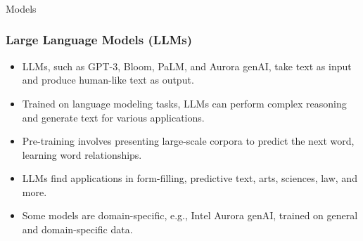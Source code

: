 \begin{frame}[fragile]\frametitle{}
\begin{center}
{\Large Models}
\end{center}
\end{frame}

\begin{frame}[fragile]
\frametitle{Large Language Models (LLMs)}

\begin{itemize}
    \item LLMs, such as GPT-3, Bloom, PaLM, and Aurora genAI, take text as input and produce human-like text as output.
    \item Trained on language modeling tasks, LLMs can perform complex reasoning and generate text for various applications.
    \item Pre-training involves presenting large-scale corpora to predict the next word, learning word relationships.
    \item LLMs find applications in form-filling, predictive text, arts, sciences, law, and more.
    \item Some models are domain-specific, e.g., Intel Aurora genAI, trained on general and domain-specific data.
\end{itemize}

\end{frame}

